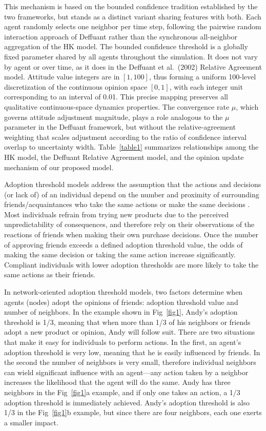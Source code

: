 \documentclass[10pt,letterpaper]{article}
\begin{document}
This mechanism is based on the bounded confidence tradition established by the two frameworks, but stands as a distinct variant sharing features with both. Each agent randomly selects one neighbor per time step, following the pairwise random interaction approach of Deffuant \cite{Deffuant2000} rather than the synchronous all-neighbor aggregation of the HK model. The bounded confidence threshold is a globally fixed parameter shared by all agents throughout the simulation. It does not vary by agent or over time, as it does in the Deffuant et al.\ (2002) \cite{Deffuant2002} Relative Agreement model. Attitude value integers are in $[1, 100]$, thus forming a uniform 100-level discretization of the continuous opinion space $[0, 1]$, with each integer unit corresponding to an interval of 0.01. This precise mapping preserves all qualitative continuous-space dynamics properties. The convergence rate $\mu$, which governs attitude adjustment magnitude, plays a role analogous to the $\mu$ parameter in the Deffuant framework, but without the relative-agreement weighting that scales adjustment according to the ratio of confidence interval overlap to uncertainty width. Table~\ref{table1} summarizes relationships among the HK model, the Deffuant Relative Agreement model, and the opinion update mechanism of our proposed model.

Adoption threshold models address the assumption that the actions and decisions (or lack of) of an individual depend on the number and proximity of surrounding friends/acquaintances who take the same actions or make the same decisions \cite{Watts2004}. Most individuals refrain from trying new products due to the perceived unpredictability of consequences, and therefore rely on their observations of the reactions of friends when making their own purchase decisions. Once the number of approving friends exceeds a defined adoption threshold value, the odds of making the same decision or taking the same action increase significantly. Compliant individuals with lower adoption thresholds are more likely to take the same actions as their friends.

In network-oriented adoption threshold models, two factors determine when agents (nodes) adopt the opinions of friends: adoption threshold value and number of neighbors. In the example shown in Fig~\ref{fig1}, Andy's adoption threshold is 1/3, meaning that when more than 1/3 of his neighbors or friends adopt a new product or opinion, Andy will follow suit. There are two situations that make it easy for individuals to perform actions. In the first, an agent's adoption threshold is very low, meaning that he is easily influenced by friends. In the second the number of neighbors is very small, therefore individual neighbors can wield significant influence with an agent---any action taken by a neighbor increases the likelihood that the agent will do the same. Andy has three neighbors in the Fig~\ref{fig1}a example, and if only one takes an action, a 1/3 adoption threshold is immediately achieved. Andy's adoption threshold is also 1/3 in the Fig~\ref{fig1}b example, but since there are four neighbors, each one exerts a smaller impact.
\end{document}
